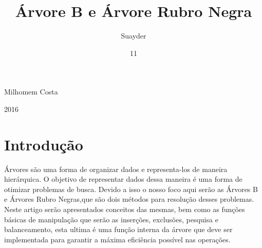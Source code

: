 \documentclass[report]{uftex}
\begin{document}
  \title{Árvore B e Árvore Rubro Negra}
  \author{Suayder}{Milhomem Costa}
  \date{11}{2016}
  \maketitle
  \frontmatter
  
  \tableofcontents %
\mainmatter
\onehalfspacing
\chapter{Introdução}
\label{sec:introducao}

\noindent Árvores são uma forma de organizar dados e representa-los de maneira hierárquica. O objetivo de representar dados dessa maneira é uma forma de otimizar problemas de busca. Devido a isso o nosso foco aqui serão as Árvores B e Árvores Rubro Negras,que são dois métodos para resolução desses problemas. Neste artigo serão apresentados conceitos das mesmas, bem como as funções básicas de manipulação que serão as inserções, exclusões, pesquisa e balanceamento, esta ultima é uma função interna da árvore que deve ser implementada para garantir a máxima eficiência possível nas operações.

\end{document}

